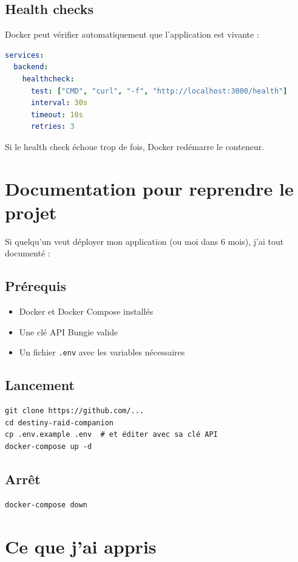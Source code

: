 \subsection{Health checks}

Docker peut vérifier automatiquement que l'application est vivante :

\begin{lstlisting}[language=yaml]
services:
  backend:
    healthcheck:
      test: ["CMD", "curl", "-f", "http://localhost:3000/health"]
      interval: 30s
      timeout: 10s
      retries: 3
\end{lstlisting}

Si le health check échoue trop de fois, Docker redémarre le conteneur.

\section{Documentation pour reprendre le projet}

Si quelqu'un veut déployer mon application (ou moi dans 6 mois), j'ai tout documenté :

\subsection{Prérequis}
\begin{itemize}
    \item Docker et Docker Compose installés
    \item Une clé API Bungie valide
    \item Un fichier \texttt{.env} avec les variables nécessaires
\end{itemize}

\subsection{Lancement}
\begin{verbatim}
git clone https://github.com/...
cd destiny-raid-companion
cp .env.example .env  # et éditer avec sa clé API
docker-compose up -d
\end{verbatim}

\subsection{Arrêt}
\begin{verbatim}
docker-compose down
\end{verbatim}

\section{Ce que j'ai appris}


